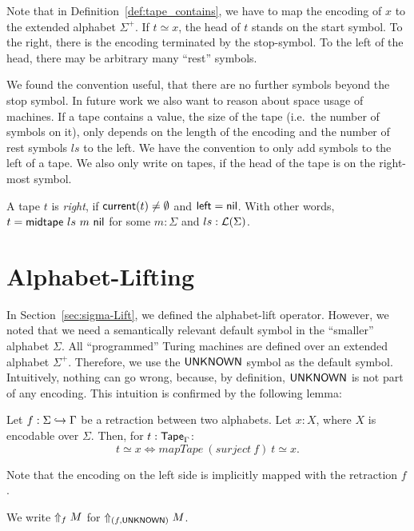 Note that in Definition~\ref{def:tape_contains}, we have to map the encoding of $x$ to the extended alphabet $\Sigma^+$.  If $t \simeq x$, the head of
$t$ stands on the start symbol.  To the right, there is the encoding terminated by the stop-symbol.  To the left of the head, there may be arbitrary
many ``rest'' symbols.

We found the convention useful, that there are no further symbols beyond the stop symbol.  In future work we also want to reason about space usage of
machines.  If a tape contains a value, the size of the tape (i.e.\ the number of symbols on it), only depends on the length of the encoding and the
number of rest symbols $ls$ to the left.  We have the convention to only add symbols to the left of a tape.  We also only write on tapes, if the head
of the tape is on the right-most symbol.

\begin{definition}
  \label{def:isRght}
  A tape $t$ is \emph{right}, if $\MS{current}(t) \neq \None$ and $\MS{left}=\nil$.  With other words, $t = \MS{midtape}~ls~m~\nil$ for some
  $m:\Sigma$ and $ls:\List(\Sigma)$.
\end{definition}

\section{Alphabet-Lifting}
\label{sec:LiftAlphabet-UNKNOWN}

In Section~\ref{sec:sigma-Lift}, we defined the alphabet-lift operator.  However, we noted that we need a semantically relevant default symbol in the
``smaller'' alphabet $\Sigma$.  All ``programmed'' Turing machines are defined over an extended alphabet $\Sigma^+$.  Therefore, we use the
$\MS{UNKNOWN}$ symbol as the default symbol.  Intuitively, nothing can go wrong, because, by definition, $\MS{UNKNOWN}$ is not part of any encoding.
This intuition is confirmed by the following lemma:
\begin{lemma}
  \label{lem:contains_translate_tau}
  Let $f: \Sigma \hookrightarrow \Tau$ be a retraction between two alphabets.  Let $x:X$, where $X$ is encodable over $\Sigma$. Then, for
  $t : \Tape_\Tau$:
  \[
    t \simeq x \iff mapTape~(surject~f)~t \simeq x.
  \]
\end{lemma}

Note that the encoding on the left side is implicitly mapped with the retraction $f$.

We write $\LiftAlphabet{M}{f}$ for $\LiftAlphabet{M}{(f, \MS{UNKNOWN})}$.

